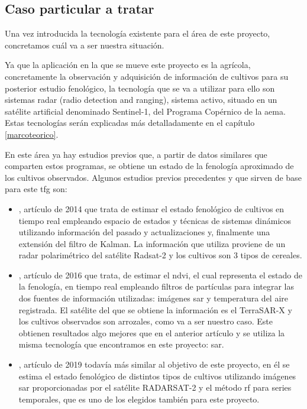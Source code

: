 \subsection{Caso particular a tratar}
\par Una vez introducida la tecnología existente para el área de este proyecto, concretamos cuál va a ser nuestra situación.
\\
\par Ya que la aplicación en la que se mueve este proyecto es la agrícola, concretamente la observación y adquisición de información de cultivos para su posterior estudio fenológico, la tecnología que se va a utilizar para ello son sistemas radar (radio detection and ranging), sistema activo, situado en un satélite artificial denominado Sentinel-1, del Programa Copérnico de la \gls{aema}. Estas tecnologías serán explicadas más detalladamente en el capítulo \ref{marcoteorico}.
\\
\par En este área ya hay estudios previos que, a partir de datos similares que comparten estos programas, se obtiene un estado de la fenología aproximado de los cultivos observados. Algunos estudios previos precedentes y que sirven de base para este \gls{tfg} son:
\\
\begin{itemize}
    \item \cite{Juanma2014}, artículo de 2014 que trata de estimar el estado fenológico de cultivos en tiempo real empleando espacio de estados y técnicas de sistemas dinámicos utilizando información del pasado y actualizaciones y, finalmente una extensión del filtro de Kalman. La información que utiliza proviene de un radar polarimétrico del satélite Radsat-2 y los cultivos son 3 tipos de cereales. 
    \\
    \item \cite{Juanma2016}, artículo de 2016 que trata, de estimar el \gls{ndvi}, el cual representa el estado de la fenología, en tiempo real empleando filtros de partículas para integrar las dos fuentes de información utilizadas: imágenes \gls{sar} y temperatura del aire registrada. El satélite del que se obtiene la información es el TerraSAR-X y los cultivos observados son arrozales, como va a ser nuestro caso. Este obtienen resultados algo mejores que en el anterior artículo y se utiliza la misma tecnología que encontramos en este proyecto: \gls{sar}. 
    \\
    \item \cite{artRF}, artículo de 2019 todavía más similar al objetivo de este proyecto, en él se estima el estado fenológico de distintos tipos de cultivos utilizando imágenes \gls{sar} proporcionadas por el satélite RADARSAT-2 y el método \gls{rf} para series temporales, que es uno de los elegidos también para este proyecto. 
\end{itemize} 

